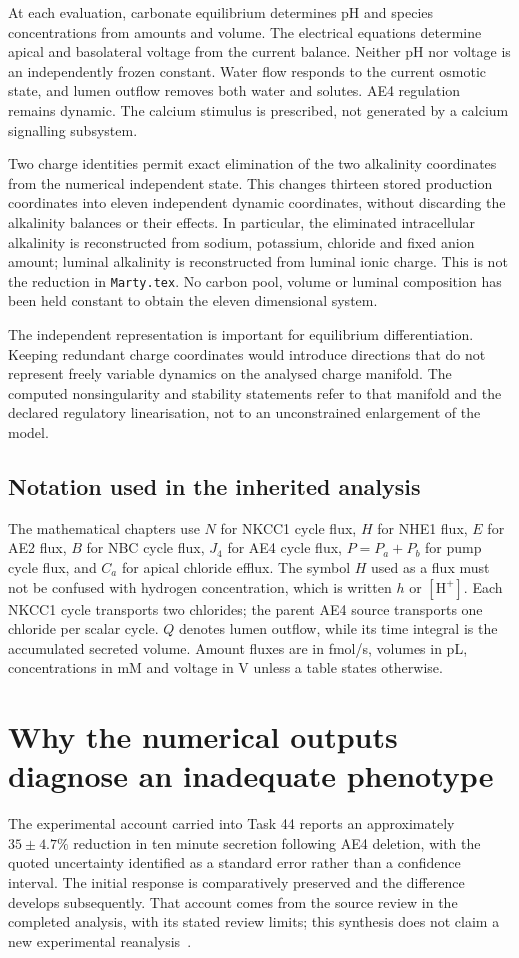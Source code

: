 At each evaluation, carbonate equilibrium determines pH and species concentrations from amounts and volume. The electrical equations determine apical and basolateral voltage from the current balance. Neither pH nor voltage is an independently frozen constant. Water flow responds to the current osmotic state, and lumen outflow removes both water and solutes. AE4 regulation remains dynamic. The calcium stimulus is prescribed, not generated by a calcium signalling subsystem.

Two charge identities permit exact elimination of the two alkalinity coordinates from the numerical independent state. This changes thirteen stored production coordinates into eleven independent dynamic coordinates, without discarding the alkalinity balances or their effects. In particular, the eliminated intracellular alkalinity is reconstructed from sodium, potassium, chloride and fixed anion amount; luminal alkalinity is reconstructed from luminal ionic charge. This is not the reduction in \texttt{Marty.tex}. No carbon pool, volume or luminal composition has been held constant to obtain the eleven dimensional system.

The independent representation is important for equilibrium differentiation. Keeping redundant charge coordinates would introduce directions that do not represent freely variable dynamics on the analysed charge manifold. The computed nonsingularity and stability statements refer to that manifold and the declared regulatory linearisation, not to an unconstrained enlargement of the model.

\subsection{Notation used in the inherited analysis}
The mathematical chapters use $N$ for NKCC1 cycle flux, $H$ for NHE1 flux, $E$ for AE2 flux, $B$ for NBC cycle flux, $J_4$ for AE4 cycle flux, $P=P_a+P_b$ for pump cycle flux, and $C_a$ for apical chloride efflux. The symbol $H$ used as a flux must not be confused with hydrogen concentration, which is written $h$ or $[\mathrm H^+]$. Each NKCC1 cycle transports two chlorides; the parent AE4 source transports one chloride per scalar cycle. $Q$ denotes lumen outflow, while its time integral is the accumulated secreted volume. Amount fluxes are in fmol/s, volumes in pL, concentrations in mM and voltage in V unless a table states otherwise.

\section{Why the numerical outputs diagnose an inadequate phenotype}
\label{sec:report-diagnosis}
The experimental account carried into Task 44 reports an approximately $35\pm4.7\%$ reduction in ten minute secretion following AE4 deletion, with the quoted uncertainty identified as a standard error rather than a confidence interval. The initial response is comparatively preserved and the difference develops subsequently. That account comes from the source review in the completed analysis, with its stated review limits; this synthesis does not claim a new experimental reanalysis~\citep{m44Pena2015}.

